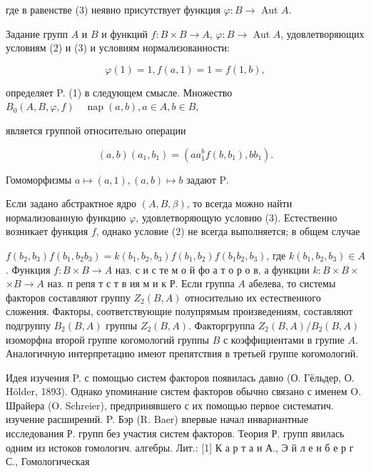 \documentclass[10pt]{article}
\begin{document}
где в равенстве (3) неявно присутствует функция $\varphi: B \rightarrow$ Aut $A$.



Задание групп $A$ и $B$ и функций $f: B \times B \rightarrow A$, $\varphi: B \rightarrow$ Aut $A$, удовлетворяющих условиям (2) и (3) и условиям нормализованности:



\[

\varphi(1)=1, f(a, 1)=1=f(1, b),

\]



определяет P. (1) в следующем смысле. Множество $B_{0}(A, B, \varphi, f) \quad \operatorname{nap}(a, b), a \in A, b \in B$,



является группой относительно операции



\[

(a, b)\left(a_{1}, b_{1}\right)=\left(a a_{1}^{b} f\left(b, b_{1}\right), b b_{1}\right) .

\]



Гомоморфизмы $a \mapsto(a, 1),(a, b) \mapsto b$ задают $\mathrm{P}$.



Если задано абстрактное ядро $(A, B, \beta)$, то всегда можно найти нормализованную функцию $\varphi$, удовлетворяющую условию (3). Естественно возникает функция $f$, однако условие (2) не всегда выполняется; в общем случае



$f\left(b_{2}, b_{3}\right) f\left(b_{1}, b_{2} b_{3}\right)=k\left(b_{1}, b_{2}, b_{3}\right) f\left(b_{1}, b_{2}\right) f\left(b_{1} b_{2}, b_{3}\right)$, где $k\left(b_{1}, b_{2}, b_{3}\right) \in A$. Функция $f: B \times B \rightarrow A$ наз. с и с те м о й фо а т о р о в, а функции $k: B \times B \times$ $\times B \rightarrow A$ наз. п репя т с т в ия м и к Р. Если группа $A$ абелева, то системы факторов составляют группу $Z_{2}(B, A)$ относительно их естественного сложения. Факторы, соответствующие полупрямым произведениям, составляют подгруппу $B_{2}(B, A)$ группы $Z_{2}(B, A)$. Факторгруппа $Z_{2}(B, A) / B_{2}(B, A)$ изоморфна второй группе когомологий группы $B$ с коэффициентами в групие $A$. Аналогичную интерпретацию имеют препятствия в третьей группе когомологий.



Идея изучения P. с помощью систем факторов появилась давно (О. Гёльдер, О. Hölder, 1893). Однако упоминание систем факторов обычно связано с именем O. Шрайера (O. Schreier), предпринявшего с их помощью первое систематич. изучение расширений. P. Бэр (R. Baer) впервые начал инвариантные исследования Р. групп без участия систем факторов. Теория Р. групп явилась одним из истоков гомологич. алгебры. Лит.: [1] К а р т а н А., Э й л е н б е р г С., Гомологическая
\end{document}
